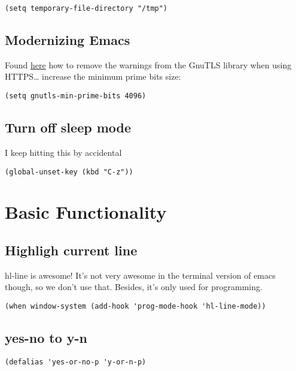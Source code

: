 \documentclass[12pt]{article}
\begin{document}
\begin{verbatim}
(setq temporary-file-directory "/tmp")
\end{verbatim}

\subsection{Modernizing Emacs}
\label{sec:org2077e97}

Found \href{https://github.com/wasamasa/dotemacs/blob/master/init.org\#init}{here} how to remove the warnings from the GnuTLS library when
using HTTPS\ldots{} increase the minimum prime bits size:
\begin{verbatim}
(setq gnutls-min-prime-bits 4096)
\end{verbatim}

\subsection{Turn off sleep mode}
\label{sec:org2d0ef56}
I keep hitting this by accidental
\begin{verbatim}
(global-unset-key (kbd "C-z"))
\end{verbatim}

\section{Basic Functionality}
\label{sec:org47346f0}
\subsection{Highligh current line}
\label{sec:org1f184d5}

hl-line is awesome! It’s not very awesome in the terminal version of emacs though, so we don’t use that. Besides, it’s only used for programming.
\begin{verbatim}
(when window-system (add-hook 'prog-mode-hook 'hl-line-mode))
\end{verbatim}

\subsection{yes-no to y-n}
\label{sec:orgadf45a2}
\begin{verbatim}
(defalias 'yes-or-no-p 'y-or-n-p)
\end{verbatim}
\end{document}
